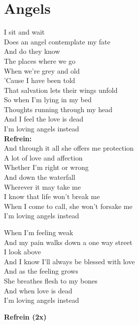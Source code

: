 

\section{Angels}
I sit and wait\\
Does an angel contemplate my fate\\
And do they know\\
The places where we go\\
When we're grey and old\\
'Cause I have been told\\
That salvation lets their wings unfold\\
So when I'm lying in my bed\\
Thoughts running through my head\\
And I feel the love is dead\\
I'm loving angels instead\\

\textbf{Refrein:}\\
And through it all she offers me protection\\
A lot of love and affection\\
Whether I'm right or wrong\\
And down the waterfall\\
Wherever it may take me\\
I know that life won't break me\\
When I come to call, she won't forsake me\\
I'm loving angels instead

When I'm feeling weak\\
And my pain walks down a one way street\\
I look above\\
And I know I'll always be blessed with love\\
And as the feeling grows\\
She breathes flesh to my bones\\
And when love is dead\\
I'm loving angels instead

\textbf{Refrein (2x)}
